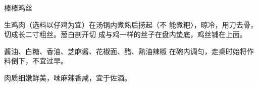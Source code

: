 \begin{recipe}{棒棒鸡丝}

\ingredients


\cooking

\step 	生鸡肉（选料以仔鸡为宜）在汤锅内煮熟后捞起（不 能煮粑〉，晾冷，用刀去骨，切成长二寸粗丝。葱白剖开切 成与鸡一样的丝子在盘内垫底，鸡丝铺在上面。

\step 	酱油、白糖、香油、芝麻酱、花椒面、醋、熟油辣椒 在碗内调匀，走桌时始将作料倒下，不宜过早。

\notes

肉质细嫩鲜美，味麻辣香咸，宜于佐酒。

\end{recipe}

